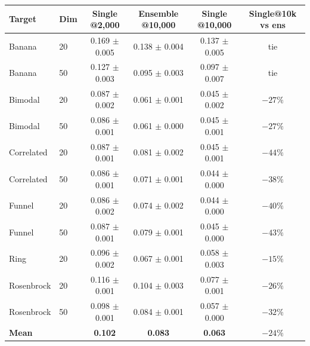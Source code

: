 \begin{tabular}{llcccc}
\toprule
Target & Dim & Single @2{,}000 & Ensemble @10{,}000 & Single @10{,}000 & Single@10k vs ens \\
\midrule
Banana & 20 & 0.169 $\pm$ 0.005 & 0.138 $\pm$ 0.004 & 0.137 $\pm$ 0.005 & tie \\
Banana & 50 & 0.127 $\pm$ 0.003 & 0.095 $\pm$ 0.003 & 0.097 $\pm$ 0.007 & tie \\
Bimodal & 20 & 0.087 $\pm$ 0.002 & 0.061 $\pm$ 0.001 & 0.045 $\pm$ 0.002 & $-27\%$ \\
Bimodal & 50 & 0.086 $\pm$ 0.001 & 0.061 $\pm$ 0.000 & 0.045 $\pm$ 0.001 & $-27\%$ \\
Correlated & 20 & 0.087 $\pm$ 0.001 & 0.081 $\pm$ 0.002 & 0.045 $\pm$ 0.001 & $-44\%$ \\
Correlated & 50 & 0.086 $\pm$ 0.001 & 0.071 $\pm$ 0.001 & 0.044 $\pm$ 0.000 & $-38\%$ \\
Funnel & 20 & 0.086 $\pm$ 0.002 & 0.074 $\pm$ 0.002 & 0.044 $\pm$ 0.000 & $-40\%$ \\
Funnel & 50 & 0.087 $\pm$ 0.001 & 0.079 $\pm$ 0.001 & 0.045 $\pm$ 0.000 & $-43\%$ \\
Ring & 20 & 0.096 $\pm$ 0.002 & 0.067 $\pm$ 0.001 & 0.058 $\pm$ 0.003 & $-15\%$ \\
Rosenbrock & 20 & 0.116 $\pm$ 0.001 & 0.104 $\pm$ 0.003 & 0.077 $\pm$ 0.001 & $-26\%$ \\
Rosenbrock & 50 & 0.098 $\pm$ 0.001 & 0.084 $\pm$ 0.001 & 0.057 $\pm$ 0.000 & $-32\%$ \\
\midrule
\textbf{Mean} & & \textbf{0.102} & \textbf{0.083} & \textbf{0.063} & \textbf{$-24\%$} \\
\bottomrule
\end{tabular}
